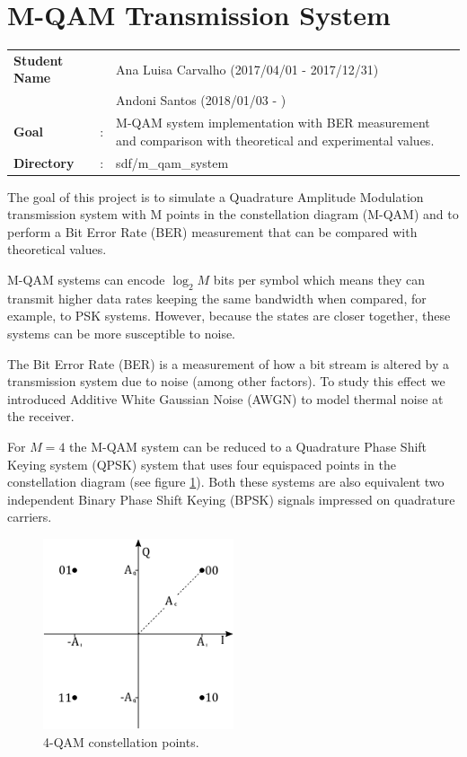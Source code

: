 \clearpage
\section{M-QAM Transmission System}

\begin{tcolorbox}	
	\begin{tabular}{p{2.75cm} p{0.2cm} p{10.5cm}} 	
		\textbf{Student Name}  & & Ana Luisa Carvalho (2017/04/01 - 2017/12/31) \\
                               & & Andoni Santos (2018/01/03 - )\\
		\textbf{Goal}          &:& M-QAM system implementation with BER measurement and comparison with theoretical and experimental values.\\
		\textbf{Directory} &:& sdf/m\_qam\_system
	\end{tabular}
\end{tcolorbox}

The goal of this project is to simulate a Quadrature Amplitude Modulation transmission system with M points in the constellation diagram (M-QAM) and to perform a Bit Error Rate (BER) measurement that can be compared with theoretical values.

M-QAM systems can encode $\log_2 M$ bits per symbol which means they can transmit higher data rates keeping the same bandwidth when compared, for example, to PSK systems. However, because the states are closer together, these systems can be more susceptible to noise.

The Bit Error Rate (BER) is a measurement of how a bit stream is altered by a transmission system due to noise (among other factors). To study this effect we introduced Additive White Gaussian Noise (AWGN) to model thermal noise at the receiver.

For $M=4$ the M-QAM system can be reduced to a Quadrature Phase Shift Keying system (QPSK) system that uses four equispaced points in the constellation diagram (see figure \ref{fig:const}). Both these systems are also equivalent two independent Binary Phase Shift Keying (BPSK) signals impressed on quadrature carriers.

\begin{figure}[h]
	\centering
	\includegraphics[width=0.5\textwidth]{./sdf/m_qam_system/figures/constellation.pdf}
	\caption{4-QAM constellation points.}
	\label{fig:const}
\end{figure}

